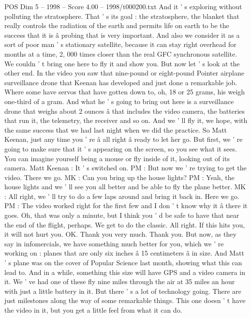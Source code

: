 \begin{textsample}{POS Dim 5 – 1998 – Score 4.00 – 1998/t000200.txt}
And it ' s exploring without polluting the stratosphere.
That ' s its goal : the stratosphere, the blanket that really controls the radiation of the earth and permits life on earth to be the success that it is â probing that is very important.
And also we consider it as a sort of poor man ' s stationary satellite, because it can stay right overhead for months at a time, 2, 000 times closer than the real GFC synchronous satellite.
We couldn ' t bring one here to fly it and show you.
But now let ' s look at the other end.
In the video you saw that nine-pound or eight-pound Pointer airplane surveillance drone that Keenan has developed and just done a remarkable job.
Where some have servos that have gotten down to, oh, 18 or 25 grams, his weigh one-third of a gram.
And what he ' s going to bring out here is a surveillance drone that weighs about 2 ounces â that includes the video camera, the batteries that run it, the telemetry, the receiver and so on.
And we ' ll fly it, we hope, with the same success that we had last night when we did the practice.
So Matt Keenan, just any time you ' re â all right â ready to let her go.
But first, we ' re going to make sure that it ' s appearing on the screen, so you see what it sees.
You can imagine yourself being a mouse or fly inside of it, looking out of its camera.
Matt Keenan : It ' s switched on.
PM : But now we ' re trying to get the video.
There we go.
MK : Can you bring up the house lights?
PM : Yeah, the house lights and we ' ll see you all better and be able to fly the plane better.
MK : All right, we ' ll try to do a few laps around and bring it back in.
Here we go.
PM : The video worked right for the first few and I don ' t know why it â there it goes.
Oh, that was only a minute, but I think you ' d be safe to have that near the end of the flight, perhaps.
We get to do the classic.
All right.
If this hits you, it will not hurt you.
OK.
Thank you very much.
Thank you.
But now, as they say in infomercials, we have something much better for you, which we ' re working on : planes that are only six inches â 15 centimeters â in size.
And Matt ' s plane was on the cover of Popular Science last month, showing what this can lead to.
And in a while, something this size will have GPS and a video camera in it.
We ' ve had one of these fly nine miles through the air at 35 miles an hour with just a little battery in it.
But there ' s a lot of technology going.
There are just milestones along the way of some remarkable things.
This one doesn ' t have the video in it, but you get a little feel from what it can do.

\end{textsample}
